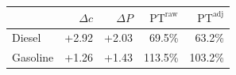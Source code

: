 \begin{tabular}{lrrrr}
\toprule
& $\Delta c$ & $\Delta P$ & $\mathrm{PT}^{\mathrm{raw}}$ & $\mathrm{PT}^{\mathrm{adj}}$ \\
\midrule
Diesel & +2.92 & +2.03 & 69.5\% & 63.2\% \\
Gasoline & +1.26 & +1.43 & 113.5\% & 103.2\% \\
\bottomrule
\end{tabular}